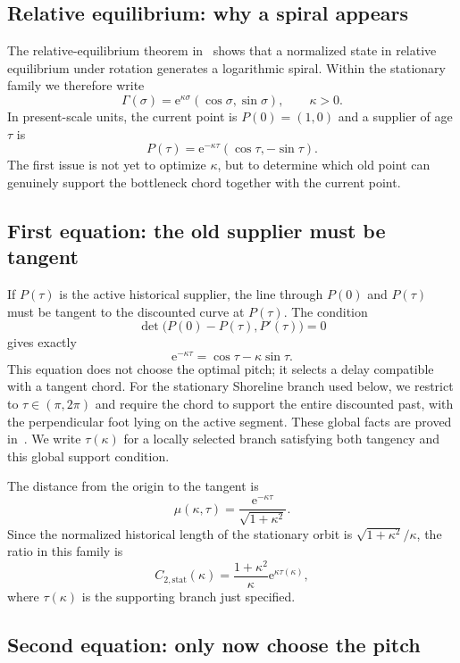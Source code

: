 \documentclass[10pt,a4paper]{article}
\newcommand{\e}{\mathrm{e}}
\theoremstyle{plain}
\theoremstyle{definition}
\theoremstyle{remark}
\begin{document}
\subsection{Relative equilibrium: why a spiral appears}

The relative-equilibrium theorem in~\cite[Theorem~12.8]{koch-cell} shows that a normalized state in relative equilibrium under rotation generates a logarithmic spiral. Within the stationary family we therefore write
\[
  \Gamma(\sigma)=\e^{\kappa\sigma}(\cos\sigma,\sin\sigma),
  \qquad \kappa>0.
\]
In present-scale units, the current point is $P(0)=(1,0)$ and a supplier of age $\tau$ is
\[
  P(\tau)=\e^{-\kappa\tau}(\cos\tau,-\sin\tau).
\]
The first issue is not yet to optimize $\kappa$, but to determine which old point can genuinely support the bottleneck chord together with the current point.

\subsection{First equation: the old supplier must be tangent}

If $P(\tau)$ is the active historical supplier, the line through $P(0)$ and $P(\tau)$ must be tangent to the discounted curve at $P(\tau)$. The condition
\[
  \det\bigl(P(0)-P(\tau),P'(\tau)\bigr)=0
\]
gives exactly
\[
  \e^{-\kappa\tau}=\cos\tau-\kappa\sin\tau.
\]
This equation does not choose the optimal pitch; it selects a delay compatible with a tangent chord. For the stationary Shoreline branch used below, we restrict to $\tau\in(\pi,2\pi)$ and require the chord to support the entire discounted past, with the perpendicular foot lying on the active segment. These global facts are proved in~\cite[Lemma~B.1]{koch-cell}. We write $\tau(\kappa)$ for a locally selected branch satisfying both tangency and this global support condition.

The distance from the origin to the tangent is
\[
  \mu(\kappa,\tau)=\frac{\e^{-\kappa\tau}}{\sqrt{1+\kappa^2}}.
\]
Since the normalized historical length of the stationary orbit is $\sqrt{1+\kappa^2}/\kappa$, the ratio in this family is
\[
  C_{2,\mathrm{stat}}(\kappa)
  =\frac{1+\kappa^2}{\kappa}\e^{\kappa\tau(\kappa)},
\]
where $\tau(\kappa)$ is the supporting branch just specified.

\subsection{Second equation: only now choose the pitch}
\end{document}
